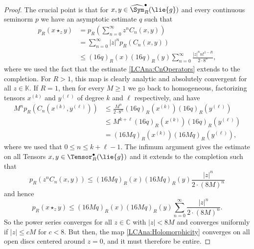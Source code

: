 \begin{proof}
	The crucial point is that for $x, y \in \widehat{\Sym}_R^\bullet
	(\lie{g})$ and every continuous seminorm $p$ we have an asymptotic
	estimate $q$ such that
	\begin{align*}
		p_R \left( x \star_z y \right)
		& =
		p_R
		\left(
			\sum\limits_{n=0}^{\infty}
			z^n C_n(x,y)
		\right)
		\\
		& =
		\sum\limits_{n=0}^{\infty}
		|z|^n
		p_R( C_n(x, y) )
		\\
		& \leq
		(16 q)_R (x)
        (16 q)_R (y)
		\sum\limits_{n=0}^{\infty}
        \frac{|z|^n n!^{1 - R}}{2 \cdot 8^n},
	\end{align*}
	where we used the fact that the estimate \eqref{LCAna:CnOperators}
	extends to the completion. For $R > 1$, this map is clearly analytic
	and absolutely convergent for all $z \in \mathbb{K}$.
	If $R = 1$, then for every $M \geq 1$ we go back to homogeneous,
	factorizing tensors $x^{(k)}$ and $y^{(\ell)}$ of degree $k$ and $\ell$
	respectively, and have
	\begin{align*}
		M^{n} p_R \left(
			C_n \left( x^{(k)}, y^{(\ell)} \right)
		\right)
		& \leq
		\frac{M^n}{2 \cdot 8^n}
		(16 q)_R \left( x^{(k)} \right)
		(16 q)_R \left( y^{(\ell)} \right)
		\\
		& \leq
		M^{k + \ell}
		(16 q)_R \left( x^{(k)} \right)
		(16 q)_R \left( y^{(\ell)} \right)
		\\
		& =
		(16M q)_R \left( x^{(k)} \right)
		(16M q)_R \left( y^{(\ell)} \right),
	\end{align*}
	where we used that $0 \leq n \leq k + \ell - 1$. The infimum argument 
	gives the estimate on all Tensors $x,y \in \Tensor_R^{\bullet}(\lie{g})$ 
	and it extends to the completion such that
	\begin{equation*}
		p_R \left( z^n C_n(x, y) \right)
		\leq
		(16M q)_R(x) (16M q)_R(y)
		\frac{|z|^n}{2 \cdot (8M)^n}
	\end{equation*}
	and hence
	\begin{equation*}
		p_R(x \star_z y)
		\leq
		(16 M q)_R (x)
        (16 M q)_R (y)
		\sum\limits_{n=0}^{\infty}
        \frac{|z|^n}{2 \cdot (8M)^n}.
	\end{equation*}
	So the power series converges for all $z \in \mathbb{C}$ with
	$|z| < 8M$ and converges uniformly if $|z| \leq c M$ for $c < 8$.
	But then, the map \eqref{LCAna:Holomorphicity} converges on all open discs
	centered around $z = 0$, and it must therefore be entire.
\end{proof}
